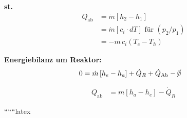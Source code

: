 \textbf{st.}
\begin{align*}
    Q_{\text{ab}} &= \dot{m} \left[ h_2 - h_1 \right] \\
    &= \dot{m} \left[ c_i \cdot dT \right] \text{ für } \left( p_2 / p_1 \right) \\
    &= -m \, c_i \left( T_c - T_h \right)
\end{align*}

\textbf{Energiebilanz um Reaktor:}
\begin{align*}
    0 &= \dot{m} \left[ h_e - h_a \right] + \dot{Q}_R + \dot{Q}_{\text{Ab}} - \cancel{0}
\end{align*}

\begin{align*}
    Q_{\text{ab}} &= m \left[ h_a - h_e \right] - \dot{Q}_R
\end{align*}

``````latex



